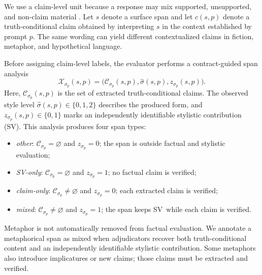 \documentclass{clv2025}
\newcommand{\SV}{\textsc{SV}}
\begin{document}
We use a claim-level unit because a response may mix supported, unsupported, and non-claim material \citep{min_factscore_2023,bayat_factbench_2024}.
Let $s$ denote a surface span and let $c(s,p)$ denote a truth-conditional claim obtained by interpreting $s$ in the context established by prompt $p$.
The same wording can yield different contextualized claims in fiction, metaphor, and hypothetical language.

Before assigning claim-level labels, the evaluator performs a contract-guided span analysis
\[
\mathcal X_{\sigma_p}(s,p)
=
\bigl(\mathcal C_{\sigma_p}(s,p),\widehat\sigma(s,p),z_{\sigma_p}(s,p)\bigr).
\]
Here, $\mathcal C_{\sigma_p}(s,p)$ is the set of extracted truth-conditional claims.
The observed style level $\widehat\sigma(s,p)\in\{0,1,2\}$ describes the produced form, and $z_{\sigma_p}(s,p)\in\{0,1\}$ marks an independently identifiable stylistic contribution (\SV).
This analysis produces four span types:
\begin{itemize}
  \item \emph{other}: $\mathcal C_{\sigma_p}=\varnothing$ and $z_{\sigma_p}=0$; the span is outside factual and stylistic evaluation;
  \item \emph{SV-only}: $\mathcal C_{\sigma_p}=\varnothing$ and $z_{\sigma_p}=1$; no factual claim is verified;
  \item \emph{claim-only}: $\mathcal C_{\sigma_p}\neq\varnothing$ and $z_{\sigma_p}=0$; each extracted claim is verified;
  \item \emph{mixed}: $\mathcal C_{\sigma_p}\neq\varnothing$ and $z_{\sigma_p}=1$; the span keeps \SV\ while each claim is verified.
\end{itemize}
Metaphor is not automatically removed from factual evaluation.
We annotate a metaphorical span as mixed when adjudicators recover both truth-conditional content and an independently identifiable stylistic contribution.
Some metaphors also introduce implicatures or new claims; those claims must be extracted and verified.
\end{document}
